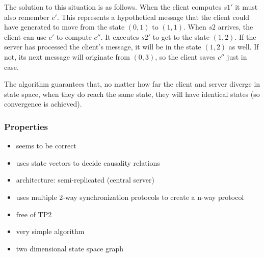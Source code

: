 The solution to this situation is as follows. When the client computes $s1'$ it must also remember $c'$. This represents a hypothetical message that the client could have generated to move from the state $(0,1)$ to $(1,1)$. When $s2$ arrives, the client can use $c'$ to compute $c''$. It executes $s2'$ to get to the state $(1,2)$. If the server has processed the client's message, it will be in the state $(1,2)$ as well. If not, its next message will originate from $(0,3)$, so the client saves $c''$ just in case.

The algorithm guarantees that, no matter how far the client and server diverge in state space, when they do reach the same state, they will have identical states (so convergence is achieved).


\subsubsection{Properties}
\begin{itemize}
 \item seems to be correct
 \item uses state vectors to decide causality relations
 \item architecture: semi-replicated (central server)
 \item uses multiple 2-way synchronization protocols to create a n-way protocol
 \item free of TP2
 \item very simple algorithm
 \item two dimensional state space graph
\end{itemize}

